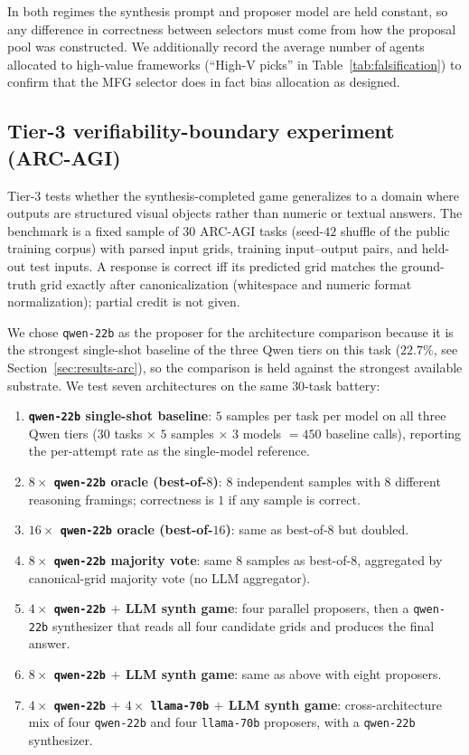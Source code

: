 \documentclass[11pt]{amsart}
\newcommand\1{{\mathds{1}}}
\theoremstyle{definition}
\theoremstyle{remark}
\numberwithin{equation}{section}
\begin{document}
In both regimes the synthesis prompt and proposer model are held constant, so any difference in correctness between selectors must come from how the proposal pool was constructed.
We additionally record the average number of agents allocated to high-value frameworks (``High-V picks'' in Table~\ref{tab:falsification}) to confirm that the MFG selector does in fact bias allocation as designed.

\subsection{Tier-3 verifiability-boundary experiment (ARC-AGI)}\label{sec:tier3}

Tier-3 tests whether the synthesis-completed game generalizes to a domain where outputs are structured visual objects rather than numeric or textual answers.
The benchmark is a fixed sample of $30$ ARC-AGI tasks (seed-$42$ shuffle of the public training corpus) with parsed input grids, training input--output pairs, and held-out test inputs.
A response is correct iff its predicted grid matches the ground-truth grid exactly after canonicalization (whitespace and numeric format normalization); partial credit is not given.

We chose \texttt{qwen-22b} as the proposer for the architecture comparison because it is the strongest single-shot baseline of the three Qwen tiers on this task ($22.7\%$, see Section~\ref{sec:results-arc}), so the comparison is held against the strongest available substrate.
We test seven architectures on the same $30$-task battery:
\begin{enumerate}[leftmargin=1.4em, itemsep=2pt]
\item \textbf{\texttt{qwen-22b} single-shot baseline}: $5$ samples per task per model on all three Qwen tiers ($30$ tasks $\times$ $5$ samples $\times$ $3$ models $=\!450$ baseline calls), reporting the per-attempt rate as the single-model reference.
\item \textbf{$8\times$ \texttt{qwen-22b} oracle (best-of-$8$)}: $8$ independent samples with $8$ different reasoning framings; correctness is $1$ if any sample is correct.
\item \textbf{$16\times$ \texttt{qwen-22b} oracle (best-of-$16$)}: same as best-of-$8$ but doubled.
\item \textbf{$8\times$ \texttt{qwen-22b} majority vote}: same $8$ samples as best-of-$8$, aggregated by canonical-grid majority vote (no LLM aggregator).
\item \textbf{$4\times$ \texttt{qwen-22b} $+$ LLM synth game}: four parallel proposers, then a \texttt{qwen-22b} synthesizer that reads all four candidate grids and produces the final answer.
\item \textbf{$8\times$ \texttt{qwen-22b} $+$ LLM synth game}: same as above with eight proposers.
\item \textbf{$4\times$ \texttt{qwen-22b} $+$ $4\times$ \texttt{llama-70b} $+$ LLM synth game}: cross-architecture mix of four \texttt{qwen-22b} and four \texttt{llama-70b} proposers, with a \texttt{qwen-22b} synthesizer.
\end{enumerate}
\end{document}
